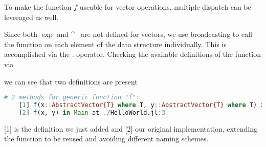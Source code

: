 

To make the function $f$ useable for vector operations, multiple dispatch can be leveraged as well. 



Since both $\exp$ and \^~ are not defined for vectors, we use broadcasting to call the function on each element of the data structure individually. This is accomplished via the 
. operator. Checking the available definitions of the function via 



we can see that two definitions are present

\begin{lstlisting}[language=Julia]
    # 2 methods for generic function "f":
    [1] f(x::AbstractVector{T} where T, y::AbstractVector{T} where T) in Main at ./HelloWorld.jl:32
    [2] f(x, y) in Main at ./HelloWorld.jl:3
\end{lstlisting}

[1] is the definition we just added and [2] our original implementation, extending the function to be reused and avoiding different naming schemes.









